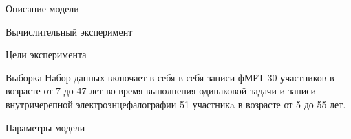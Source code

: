 \documentclass[9pt,pdf]{beamer} %
\begin{document}
\begin{frame}{Описание модели}


\end{frame}
\begin{frame}{Вычислительный эксперимент}
\vspace{-0.1cm}
\begin{block}{Цели эксперимента}

\end{block}
\begin{block}{Выборка} 
Набор данных включает в себя в себя записи фМРТ 30 участников в возрасте от 7 до 47 лет во время выполнения одинаковой задачи и записи внутричерепной электроэнцефалографии 51 участникa в возрасте от 5 до 55 лет. 

\end{block}
\begin{block}{Параметры модели} 

\end{block}
\end{frame}

\begin{frame}{}




\end{frame}
\begin{frame}{}



\end{frame}
\begin{frame}{}

\end{frame}
\end{document}
